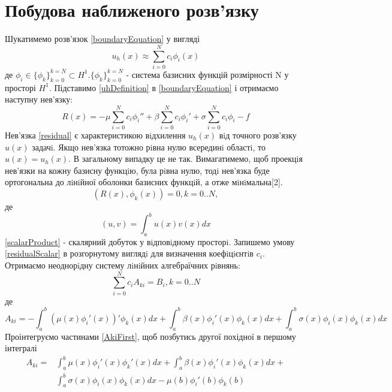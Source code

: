 \documentclass[a4paper]{article}
\numberwithin{equation}{section}
\begin{document}
\section{Побудова наближеного розв’язку}
Шукатимемо розв’язок \ref{boundaryEquation} у вигляді 
\begin{equation}\label{uhDefinition}
u_h(x)\approx\sum_{i=0}^{N} c_i\phi_i(x)
\end{equation}
де $\phi_i\in\{\phi_k\}_{k=0}^{k=N} \subset H^1. \{\phi_k\}_{k=0}^{k=N}$ - система базисних функцій розмірності N у просторі $H^1$. Підставимо \ref{uhDefinition} в \ref{boundaryEquation} і отримаємо наступну нев’язку:
\begin{equation}\label{residual}
R(x) = -\mu\sum_{i=0}^{N} c_i\phi_i'' + \beta\sum_{i=0}^{N} c_i\phi_i' + \sigma\sum_{i=0}^{N} c_i\phi_i - f
\end{equation}
Нев’язка \ref{residual} є характеристикою вiдхилення $u_h(x)$ вiд точного розв’язку $u(x)$ задачi. Якщо нев’язка тотожно рiвна нулю всерединi областi, то $u(x) = u_h(x)$. В загальному випадку це не так. Вимагати\-мемо, щоб проекцiя нев’язки на кожну базисну функцiю, була рiвна нулю, тодi нев’язка буде ортогональна до лiнiйної оболонки базисних функцiй, а отже мiнiмальна[2].
\begin{equation}\label{residualScalar}
(R(x), \phi_k(x)) = 0, k = 0..N,
\end{equation}
де
\begin{equation}\label{scalarProduct}
(u, v) = \int_a^b u(x)v(x)dx
\end{equation}
\ref{scalarProduct} - скалярний добуток у вiдповiдному просторi. Запишемо умову \ref{residualScalar} в розгорнутому виглядi для визначення коефiцiєнтiв $ c_i $. Отримаємо неоднорiдну систему лiнiйних алгебраїчних рiвнянь:
\begin{equation}\label{matrixEquation}
\sum_{i=0}^{N} c_iA_{ki} = B_i,  k=0..N
\end{equation}
де 
\begin{equation}\label{AkiFirst}
A_{ki} = -\int_a^b (\mu(x) \phi_i'(x))' \phi_k(x) dx + \int_a^b \beta(x) \phi_i'(x) \phi_k(x)dx + \int_a^b \sigma(x) \phi_i(x) \phi_k(x)dx
\end{equation}
Проінтегруємо частинами \ref{AkiFirst}, щоб позбутись другої похідної в першому інтегралі
\begin{equation}\label{AkiSecond}
\begin{split}
A_{ki} = & \int_a^b \mu(x) \phi_i'(x) \phi_k'(x) dx + \int_a^b \beta(x) \phi_i'(x) \phi_k(x) dx + \\& \int_a^b \sigma(x) \phi_i(x) \phi_k(x) dx - \mu(b) \phi_i'(b) \phi_k(b)
\end{split}
\end{equation}
\end{document}
